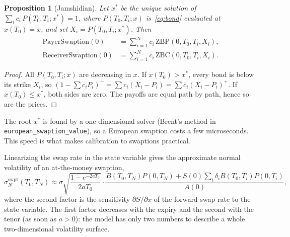 \documentclass[11pt,a4paper]{article}
\theoremstyle{plain}
\newtheorem{proposition}[theorem]{Proposition}
\theoremstyle{definition}
\begin{document}
\begin{proposition}[Jamshidian]\label{prop:jamshidian}
Let $x^*$ be the unique solution of $\sum_ic_i\,P(T_0,T_i;x^*)=1$, where $P(T_0,T_i;x)$ is~\eqref{eq:bond} evaluated at $x(T_0)=x$, and set $X_i=P(T_0,T_i;x^*)$. Then
\begin{equation}
\begin{aligned}
    \mathrm{PayerSwaption}(0)&=\sum_{i=1}^Nc_i\,\mathrm{ZBP}(0,T_0,T_i,X_i),\\
    \mathrm{ReceiverSwaption}(0)&=\sum_{i=1}^Nc_i\,\mathrm{ZBC}(0,T_0,T_i,X_i).
\end{aligned}
    \label{eq:jamshidian}
\end{equation}
\end{proposition}
\begin{proof}
All $P(T_0,T_i;x)$ are decreasing in $x$. If $x(T_0)>x^*$, every bond is below its strike $X_i$, so $(1-\sum c_iP_i)^+=\sum c_i(X_i-P_i)=\sum c_i(X_i-P_i)^+$. If $x(T_0)\leq x^*$, both sides are zero. The payoffs are equal path by path, hence so are the prices.
\end{proof}
The root $x^*$ is found by a one-dimensional solver (Brent's method in \texttt{european\_swaption\_value}), so a European swaption costs a few microseconds. This speed is what makes calibration to swaptions practical.

Linearizing the swap rate in the state variable gives the approximate normal volatility of an at-the-money swaption,
\begin{equation}
    \sigma_N^{\text{swpt}}(T_0,T_N)\approx\sigma\sqrt{\frac{1-e^{-2aT_0}}{2aT_0}}\cdot\frac{B(T_0,T_N)P(0,T_N)+S(0)\sum_i\delta_iB(T_0,T_i)P(0,T_i)}{A(0)},
    \label{eq:swaption-vol}
\end{equation}
where the second factor is the sensitivity $\partial S/\partial x$ of the forward swap rate to the state variable. The first factor decreases with the expiry and the second with the tenor (as soon as $a>0$): the model has only two numbers to describe a whole two-dimensional volatility surface.
\end{document}
